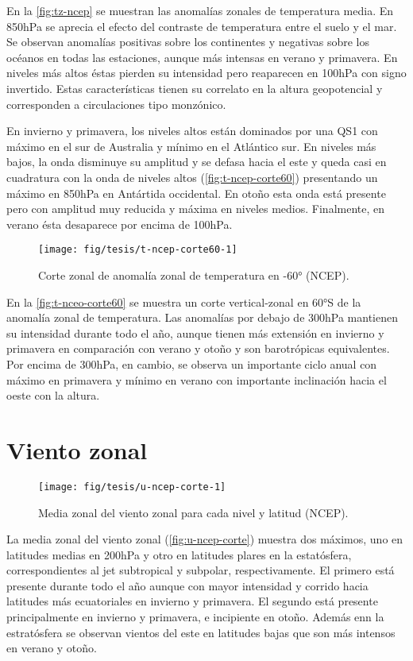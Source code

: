 \documentclass[spanish,a4paper,12p]{book}
\begin{document}
En la \autoref{fig:tz-ncep} se muestran las anomalías zonales de
temperatura media. En 850hPa se aprecia el efecto del contraste de
temperatura entre el suelo y el mar. Se observan anomalías positivas
sobre los continentes y negativas sobre los océanos en todas las
estaciones, aunque más intensas en verano y primavera. En niveles más
altos éstas pierden su intensidad pero reaparecen en 100hPa con signo
invertido. Estas características tienen su correlato en la altura
geopotencial y corresponden a circulaciones tipo monzónico.

En invierno y primavera, los niveles altos están dominados por una QS1
con máximo en el sur de Australia y mínimo en el Atlántico sur. En
niveles más bajos, la onda disminuye su amplitud y se defasa hacia el
este y queda casi en cuadratura con la onda de niveles altos
(\autoref{fig:t-ncep-corte60}) presentando un máximo en 850hPa en
Antártida occidental. En otoño esta onda está presente pero con amplitud
muy reducida y máxima en niveles medios. Finalmente, en verano ésta
desaparece por encima de 100hPa.

\begin{figure*}
\texttt{[image: fig/tesis/t-ncep-corte60-1]} \caption{Corte zonal de anomalía zonal de temperatura en -60° (NCEP).}\label{fig:t-ncep-corte60}
\end{figure*}

En la \autoref{fig:t-nceo-corte60} se muestra un corte vertical-zonal en
60°S de la anomalía zonal de temperatura. Las anomalías por debajo de
300hPa mantienen su intensidad durante todo el año, aunque tienen más
extensión en invierno y primavera en comparación con verano y otoño y
son barotrópicas equivalentes. Por encima de 300hPa, en cambio, se
observa un importante ciclo anual con máximo en primavera y mínimo en
verano con importante inclinación hacia el oeste con la altura.

\section{Viento zonal}\label{viento-zonal}

\begin{figure*}
\texttt{[image: fig/tesis/u-ncep-corte-1]} \caption{Media zonal del viento zonal para cada nivel y latitud (NCEP).}\label{fig:u-ncep-corte}
\end{figure*}

La media zonal del viento zonal (\autoref{fig:u-ncep-corte}) muestra dos
máximos, uno en latitudes medias en 200hPa y otro en latitudes plares en
la estatósfera, correspondientes al jet subtropical y subpolar,
respectivamente. El primero está presente durante todo el año aunque con
mayor intensidad y corrido hacia latitudes más ecuatoriales en invierno
y primavera. El segundo está presente principalmente en invierno y
primavera, e incipiente en otoño. Además enn la estratósfera se observan
vientos del este en latitudes bajas que son más intensos en verano y
otoño.
\end{document}
